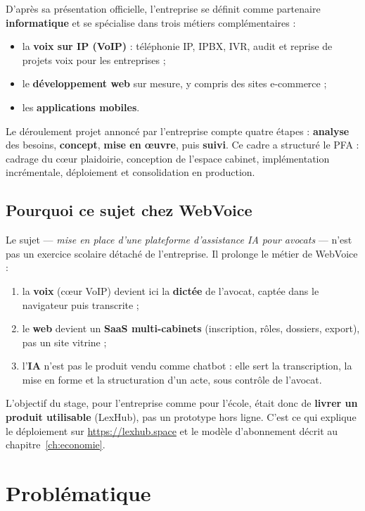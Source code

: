 D'après sa présentation officielle, l'entreprise se définit comme partenaire \textbf{informatique} et se spécialise dans trois métiers complémentaires :

\begin{itemize}[leftmargin=1.4em]
  \item la \textbf{voix sur IP (VoIP)} : téléphonie IP, IPBX, IVR, audit et reprise de projets voix pour les entreprises ;
  \item le \textbf{développement web} sur mesure, y compris des sites e-commerce ;
  \item les \textbf{applications mobiles}.
\end{itemize}

Le déroulement projet annoncé par l'entreprise compte quatre étapes : \textbf{analyse} des besoins, \textbf{concept}, \textbf{mise en œuvre}, puis \textbf{suivi}. Ce cadre a structuré le PFA : cadrage du cœur plaidoirie, conception de l'espace cabinet, implémentation incrémentale, déploiement et consolidation en production.

\subsection{Pourquoi ce sujet chez WebVoice}

Le sujet --- \emph{mise en place d'une plateforme d'assistance IA pour avocats} --- n'est pas un exercice scolaire détaché de l'entreprise. Il prolonge le métier de WebVoice :

\begin{enumerate}[leftmargin=1.4em]
  \item la \textbf{voix} (cœur VoIP) devient ici la \textbf{dictée} de l'avocat, captée dans le navigateur puis transcrite ;
  \item le \textbf{web} devient un \textbf{SaaS multi-cabinets} (inscription, rôles, dossiers, export), pas un site vitrine ;
  \item l'\textbf{IA} n'est pas le produit vendu comme chatbot : elle sert la transcription, la mise en forme et la structuration d'un acte, sous contrôle de l'avocat.
\end{enumerate}

L'objectif du stage, pour l'entreprise comme pour l'école, était donc de \textbf{livrer un produit utilisable} (LexHub), pas un prototype hors ligne. C'est ce qui explique le déploiement sur \url{https://lexhub.space} et le modèle d'abonnement décrit au chapitre~\ref{ch:economie}.

\section{Problématique}
\label{sec:problematique}

